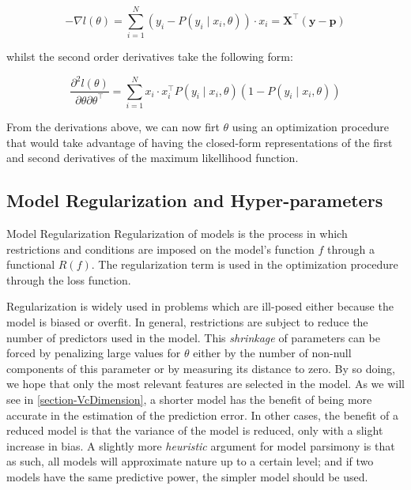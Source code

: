 \begin{equation}
- \nabla  l(\theta) = \sum_{i=1}^N (y_i - P(y_i \mid x_i,\theta))\cdot x_i = \textbf{X}^{\intercal}(\textbf{y}-\textbf{p})
\end{equation}

whilst the second order derivatives take the following form:

\begin{equation}
\frac{\partial^2 l(\theta)}{\partial \theta \partial \theta^\intercal} = \sum_{i=1}^N x_i \cdot x_i^\intercal P(y_i \mid x_i,\theta)(1 -P(y_i \mid x_i,\theta))
\end{equation}

From the derivations above, we can now firt $\theta$ using an optimization procedure that would take advantage of having the closed-form representations of the first and second derivatives of the maximum likellihood function. 


\subsection{Model Regularization and Hyper-parameters} \label{subsection-hyperParametersRegularization}


\begin{definition}{Model Regularization}
Regularization of models is the process in which restrictions and conditions are imposed on the model's function $f$ through a functional $ R(f)$. The regularization term is used in the optimization procedure through the loss function.
\end{definition}

Regularization is widely used in problems which are ill-posed either because the model is biased or overfit. In general, restrictions are subject to reduce the number of predictors used in the model. This \textit{shrinkage} of parameters can be forced by penalizing large values for $\theta$ either by the number of non-null components of this parameter or by measuring its distance to zero. By so doing, we hope that only the most relevant features are selected in the model. As we will see in \ref{section-VcDimension}, a shorter model has the benefit of being more accurate in the estimation of the prediction error. In other cases, the benefit of a reduced model is that the variance of the model is reduced, only with a slight increase in bias. A slightly more \textit{heuristic} argument for model parsimony is that as such, all models will approximate nature up to a certain level; and if two models have the same predictive power, the simpler model should be used.


